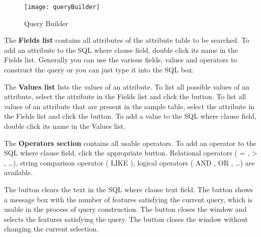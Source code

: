 \begin{figure}[ht]
  \begin{center}
    \caption{Query Builder \nixcaption}\label{fig:query_builder}\smallskip
    \texttt{[image: queryBuilder]}
  \end{center}  
\end{figure}

The \textbf{Fields list} contains all attributes of the attribute table to be 
searched. To add an attribute to the SQL where clause field, double click its 
name in the Fields list. Generally you can use the various fields, values and 
operators to construct the query or you can just type it into the SQL box. 

The \textbf{Values list} lists the values of an attribute. To list all possible 
values of an attribute, select the attribute in the Fields list and click the 
 button. To list all values 
of an attribute that are present in the sample table, select the attribute in 
the Fields list and click the  
button. To add a value to the SQL 
where clause field, double click its name in the Values list.   

The \textbf{Operators section} contains all usable operators. To add an operator 
to the SQL where clause field, click the appropriate button. Relational operators 
( = , > , \dots), string comparison operator ( LIKE ), logical operators ( AND , OR 
, \dots) are available. 

The  button clears the text in the SQL where clause text field. The 
 button shows a message box with the number of features satisfying 
the current query, which is usable in the process of query construction. The 
 button closes the window and selects the features satisfying the 
query. The  button closes the window without changing the current 
selection. 

\begin{Tip}\caption{\textsc{Changing the Layer Definition}}
\end{Tip}

